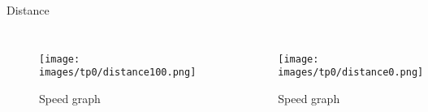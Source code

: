 \begin{frame}{Distance}



\begin{columns}
	\begin{figure}[htb]
	\texttt{[image: images/tp0/distance100.png]}
	\caption{Speed graph}
	\label{fig:TestResults:distance100}
	\end{figure}

	\begin{figure}[htb]
	\texttt{[image: images/tp0/distance0.png]}
	\caption{Speed graph}
	\label{fig:TestResults:distance0}
	\end{figure}
\end{columns}
\end{frame}